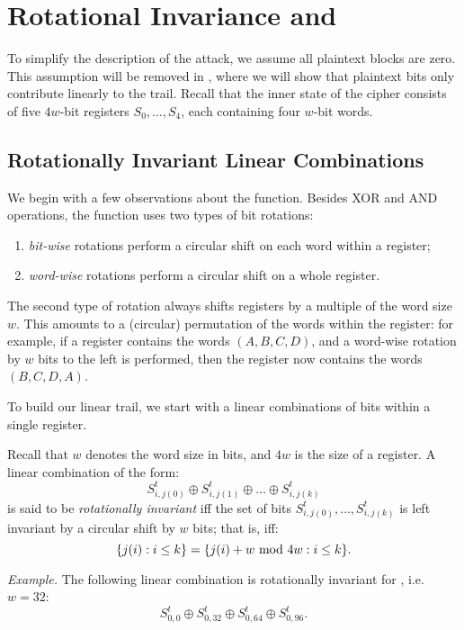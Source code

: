 
\section{Rotational Invariance and \MiniMORUS}
\label{sec/introminimorus}

To simplify the description of the attack, we assume all plaintext blocks are zero. This assumption will be removed in , where we will show that plaintext bits only contribute linearly to the trail. Recall that the inner state of the cipher consists of five $4w$-bit registers $S_0,\dots,S_4$, each containing four $w$-bit words.

\subsection{Rotationally Invariant Linear Combinations}

We begin with a few observations about the \StateUpdate{} function. Besides XOR and AND operations, the \StateUpdate{} function uses two types of bit rotations:
\begin{enumerate}
\item \emph{bit-wise} rotations perform a circular shift on each word within a register;
\item \emph{word-wise} rotations perform a circular shift on a whole register.
\end{enumerate}
The second type of rotation always shifts registers by a multiple of the word size $w$. This amounts to a (circular) permutation of the words within the register: for example, if a register contains the words $(A, B, C, D)$, and a word-wise rotation by $w$ bits to the left is performed, then the register now contains the words $(B, C, D, A)$.

To build our linear trail, we start with a linear combinations of bits within a single register.
\begin{definition}
Recall that $w$ denotes the word size in bits, and $4w$ is the size of a register. A linear combination of the form:
\[
S^t_{i,j(0)} \oplus S^t_{i,j(1)} \oplus \dots \oplus S^t_{i,j(k)}
\]
is said to be \emph{rotationally invariant} iff the set of bits $S^t_{i,j(0)}, \dots, S^t_{i,j(k)}$ is left invariant by a circular shift by $w$ bits; that is, iff:
\[
\{j(i) : i\leq k\} = \{j(i) + w \text{\rm{} mod } 4w : i\leq k\}.
\]
\end{definition}
\emph{Example.} The following linear combination is rotationally invariant for \MORUS[640], i.e. $w = 32$:
\begin{equation}
S^t_{0,0} \oplus S^t_{0,32} \oplus S^t_{0,64} \oplus S^t_{0,96}.
\label{eq:symmetric}
\end{equation}

